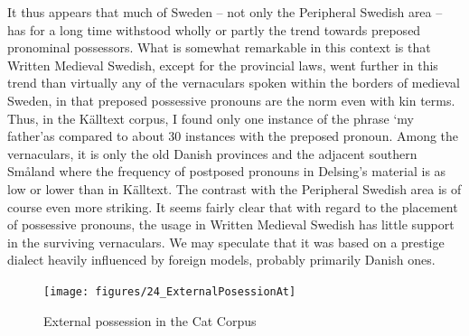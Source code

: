 {{{{{{{{It thus appears that much of Sweden – not only the Peripheral Swedish area – has for a long time withstood wholly or partly the trend towards preposed pronominal possessors. What is somewhat remarkable in this context is that Written Medieval Swedish, except for the provincial laws, went further in this trend than virtually any of the vernaculars spoken within the borders of medieval Sweden, in that preposed possessive pronouns are the norm even with kin terms. Thus, in the Källtext corpus, I found only one instance of the phrase ‘my father’\textstyleLinguisticExample{ }as compared to about 30 instances with the preposed pronoun. Among the vernaculars, it is only the old Danish provinces and the adjacent southern Småland where the frequency of postposed pronouns in Delsing’s material is as low or lower than in Källtext. The contrast with the Peripheral Swedish area is of course even more striking. It seems fairly clear that with regard to the placement of possessive pronouns, the usage in Written Medieval Swedish has little support in the surviving vernaculars. We may speculate that it was based on a prestige dialect heavily influenced by foreign models, probably primarily Danish ones.

 

\begin{figure}[h]

\texttt{[image: figures/24\_ExternalPosessionAt]}
\caption{External possession in the Cat Corpus}
\label{map:20}

\end{figure}

\begin{figure}[h]


\end{figure}}}}}}}}}
